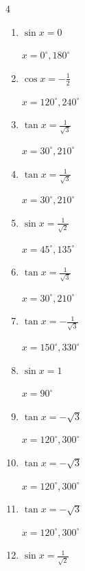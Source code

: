 \begin{multicols}{4}
\begin{enumerate}
        $\displaystyle x = 60^{\circ} , 240^{\circ}$

  \item $\displaystyle \sin{x}  = 0$

        $\displaystyle x = 0^{\circ} , 180^{\circ}$

  \item $\displaystyle \cos{x}  = -\frac{1}{2}$

        $\displaystyle x = 120^{\circ} , 240^{\circ}$

  \item $\displaystyle \tan{x}  = \frac{1}{\sqrt{3}}$

        $\displaystyle x = 30^{\circ} , 210^{\circ}$

  \item $\displaystyle \tan{x}  = \frac{1}{\sqrt{3}}$

        $\displaystyle x = 30^{\circ} , 210^{\circ}$

\columnbreak %

  \item $\displaystyle \sin{x}  = \frac{1}{\sqrt{2}}$

        $\displaystyle x = 45^{\circ} , 135^{\circ}$

  \item $\displaystyle \tan{x}  = \frac{1}{\sqrt{3}}$

        $\displaystyle x = 30^{\circ} , 210^{\circ}$

  \item $\displaystyle \tan{x}  = -\frac{1}{\sqrt{3}}$

        $\displaystyle x = 150^{\circ} , 330^{\circ}$

  \item $\displaystyle \sin{x}  = 1$

        $\displaystyle x = 90^{\circ}$

  \item $\displaystyle \tan{x}  = -\sqrt{3}$

        $\displaystyle x = 120^{\circ} , 300^{\circ}$

  \item $\displaystyle \tan{x}  = -\sqrt{3}$

        $\displaystyle x = 120^{\circ} , 300^{\circ}$

  \item $\displaystyle \tan{x}  = -\sqrt{3}$

        $\displaystyle x = 120^{\circ} , 300^{\circ}$

  \item $\displaystyle \sin{x}  = \frac{1}{\sqrt{2}}$


\end{enumerate}
\end{multicols}

